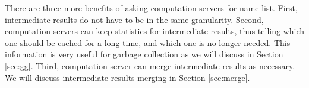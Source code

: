 There are three more benefits of asking computation servers for name list.  
First, intermediate results do not have to be in the same granularity.  
Second, computation servers can keep statistics for intermediate results, thus telling which one should be cached for a long time, and which one is no longer needed. 
This information is very useful for garbage collection as we will discuss in Section \ref{sec:gg}.
Third, computation server can merge intermediate results as necessary. We will discuss intermediate results merging in Section \ref{sec:merge}.
